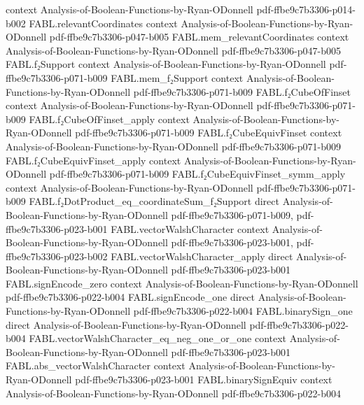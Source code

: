 \begin{theorem}
  {context}
  {Analysis-of-Boolean-Functions-by-Ryan-ODonnell}
  {pdf-ffbe9c7b3306-p014-b002}
\proofstep
  {FABL.relevantCoordinates}
  {context}
  {Analysis-of-Boolean-Functions-by-Ryan-ODonnell}
  {pdf-ffbe9c7b3306-p047-b005}
\proofstep
  {FABL.mem_relevantCoordinates}
  {context}
  {Analysis-of-Boolean-Functions-by-Ryan-ODonnell}
  {pdf-ffbe9c7b3306-p047-b005}
\proofstep
  {FABL.f₂Support}
  {context}
  {Analysis-of-Boolean-Functions-by-Ryan-ODonnell}
  {pdf-ffbe9c7b3306-p071-b009}
\proofstep
  {FABL.mem_f₂Support}
  {context}
  {Analysis-of-Boolean-Functions-by-Ryan-ODonnell}
  {pdf-ffbe9c7b3306-p071-b009}
\proofstep
  {FABL.f₂CubeOfFinset}
  {context}
  {Analysis-of-Boolean-Functions-by-Ryan-ODonnell}
  {pdf-ffbe9c7b3306-p071-b009}
\proofstep
  {FABL.f₂CubeOfFinset_apply}
  {context}
  {Analysis-of-Boolean-Functions-by-Ryan-ODonnell}
  {pdf-ffbe9c7b3306-p071-b009}
\proofstep
  {FABL.f₂CubeEquivFinset}
  {context}
  {Analysis-of-Boolean-Functions-by-Ryan-ODonnell}
  {pdf-ffbe9c7b3306-p071-b009}
\proofstep
  {FABL.f₂CubeEquivFinset_apply}
  {context}
  {Analysis-of-Boolean-Functions-by-Ryan-ODonnell}
  {pdf-ffbe9c7b3306-p071-b009}
\proofstep
  {FABL.f₂CubeEquivFinset_symm_apply}
  {context}
  {Analysis-of-Boolean-Functions-by-Ryan-ODonnell}
  {pdf-ffbe9c7b3306-p071-b009}
\proofstep
  {FABL.f₂DotProduct_eq_coordinateSum_f₂Support}
  {direct}
  {Analysis-of-Boolean-Functions-by-Ryan-ODonnell}
  {pdf-ffbe9c7b3306-p071-b009,
    pdf-ffbe9c7b3306-p023-b001}
\proofstep
  {FABL.vectorWalshCharacter}
  {context}
  {Analysis-of-Boolean-Functions-by-Ryan-ODonnell}
  {pdf-ffbe9c7b3306-p023-b001,
    pdf-ffbe9c7b3306-p023-b002}
\proofstep
  {FABL.vectorWalshCharacter_apply}
  {direct}
  {Analysis-of-Boolean-Functions-by-Ryan-ODonnell}
  {pdf-ffbe9c7b3306-p023-b001}
\proofstep
  {FABL.signEncode_zero}
  {context}
  {Analysis-of-Boolean-Functions-by-Ryan-ODonnell}
  {pdf-ffbe9c7b3306-p022-b004}
\proofstep
  {FABL.signEncode_one}
  {direct}
  {Analysis-of-Boolean-Functions-by-Ryan-ODonnell}
  {pdf-ffbe9c7b3306-p022-b004}
\proofstep
  {FABL.binarySign_one}
  {direct}
  {Analysis-of-Boolean-Functions-by-Ryan-ODonnell}
  {pdf-ffbe9c7b3306-p022-b004}
\proofstep
  {FABL.vectorWalshCharacter_eq_neg_one_or_one}
  {context}
  {Analysis-of-Boolean-Functions-by-Ryan-ODonnell}
  {pdf-ffbe9c7b3306-p023-b001}
\proofstep
  {FABL.abs_vectorWalshCharacter}
  {context}
  {Analysis-of-Boolean-Functions-by-Ryan-ODonnell}
  {pdf-ffbe9c7b3306-p023-b001}
\proofstep
  {FABL.binarySignEquiv}
  {context}
  {Analysis-of-Boolean-Functions-by-Ryan-ODonnell}
  {pdf-ffbe9c7b3306-p022-b004}
\proofstep

\end{theorem}
